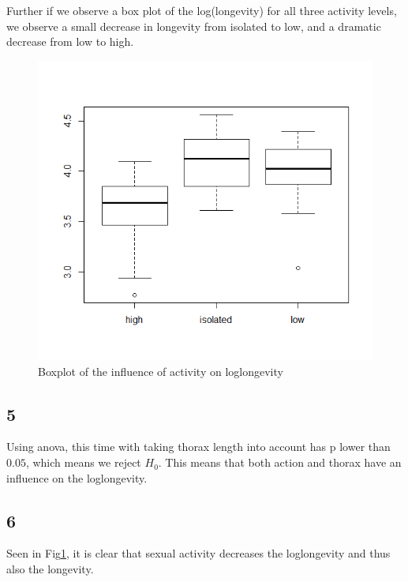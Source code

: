 \documentclass{article}
\begin{document}
      Further if we observe a box plot of the log(longevity) for all three activity levels, we observe a small decrease in longevity from isolated to low, and a dramatic decrease from low to high.
      \begin{figure}[H]
          \centering
          \includegraphics[scale=0.3]{../results/BoxActivity.png}
          \caption{Boxplot of the influence of activity on loglongevity}
          \label{fig:BoxActivity}
      \end{figure}

    \subsection*{5}
      Using anova, this time with taking thorax length into account has p lower than $0.05$, which means we reject $H_0$.
      This means that both action and thorax have an influence on the loglongevity.

    \subsection*{6}
      Seen in Fig\ref{fig:BoxActivity}, it is clear that sexual activity decreases the loglongevity and thus also the longevity.
\end{document}
